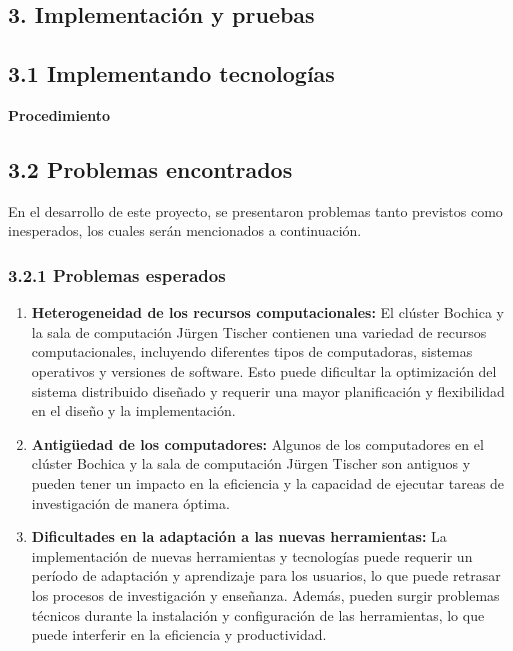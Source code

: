 \begin{doublespace}
\begin{tightcenter}
\section{3. Implementación y pruebas}
\mylinespacing
\end{tightcenter}

\subsection{3.1 Implementando tecnologías}

\textbf{Procedimiento}

\subsection{3.2 Problemas encontrados}
En el desarrollo de este proyecto, se presentaron problemas tanto previstos como inesperados, los cuales serán mencionados a continuación.

\subsubsection{3.2.1 Problemas esperados}

\begin{enumerate}
    \item \textbf{Heterogeneidad de los recursos computacionales:} El clúster Bochica y la sala de computación Jürgen Tischer contienen una variedad de recursos computacionales, incluyendo diferentes tipos de computadoras, sistemas operativos y versiones de software. Esto puede dificultar la optimización del sistema distribuido diseñado y requerir una mayor planificación y flexibilidad en el diseño y la implementación.
    \item \textbf{Antigüedad de los computadores:} Algunos de los computadores en el clúster Bochica y la sala de computación Jürgen Tischer son antiguos y pueden tener un impacto en la eficiencia y la capacidad de ejecutar tareas de investigación de manera óptima.
    \item \textbf{Dificultades en la adaptación a las nuevas herramientas:} La implementación de nuevas herramientas y tecnologías puede requerir un período de adaptación y aprendizaje para los usuarios, lo que puede retrasar los procesos de investigación y enseñanza. Además, pueden surgir problemas técnicos durante la instalación y configuración de las herramientas, lo que puede interferir en la eficiencia y productividad.
\end{enumerate}


\end{doublespace}
